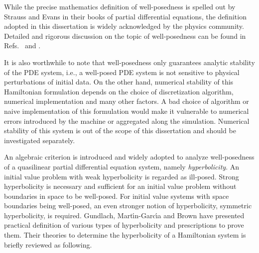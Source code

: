 While the precise mathematics definition of well-posedness is spelled out by Strauss\cite[pp. 25]{strauss1992partial} and Evans\cite[pp. 7]{evans2010partial} in their books of partial differential equations, the definition adopted in this dissertation is widely acknowledged by the physics community. Detailed and rigorous discussion on the topic of well-posedness can be found in Refs.~\cite{Calabrese:2002ej, Gundlach:2005ta, Gustafsson-Well-posed, 0264-9381-23-16-S07, PhysRevD.70.044012, lrr-1998-3, Reula:2004xd, 0264-9381-15-9-029, lrr-2012-9} and \cite[pp. 18--19]{Kreiss:navier-stokes}.

It is also worthwhile to note that well-posedness only guarantees analytic stability of the PDE system, i.e., a well-posed PDE system is not sensitive to physical perturbations of initial data. On the other hand, numerical stability of this Hamiltonian formulation depends on the choice of discretization algorithm, numerical implementation and many other factors. A bad choice of algorithm or naive implementation of this formulation would make it vulnerable to numerical errors introduced by the machine or aggregated along the simulation. Numerical stability of this system is out of the scope of this dissertation and should be investigated separately. 

An algebraic criterion is introduced and widely adopted to analyze well-posedness of a quasilinear partial differential equation system, namely {\em hyperbolicity}. An initial value problem with weak hyperbolicity is regarded as ill-posed. Strong hyperbolicity is necessary and sufficient for an initial value problem without boundaries in space to be well-posed. For initial value systems with space boundaries being well-posed, an even stronger notion of hyperbolicity, symmetric hyperbolicity, is required. Gundlach, Mart\' \i n-Garc\' \i a\cite{Gundlach:2004ri, Gundlach:2004jp, Gundlach:2005ta, Gundlach:2006tw} and Brown\cite{Brown:2008cca} have presented practical definition of various types of hyperbolicity and prescriptions to prove them. Their theories to determine the hyperbolicity of a Hamiltonian system is briefly reviewed as following. 

